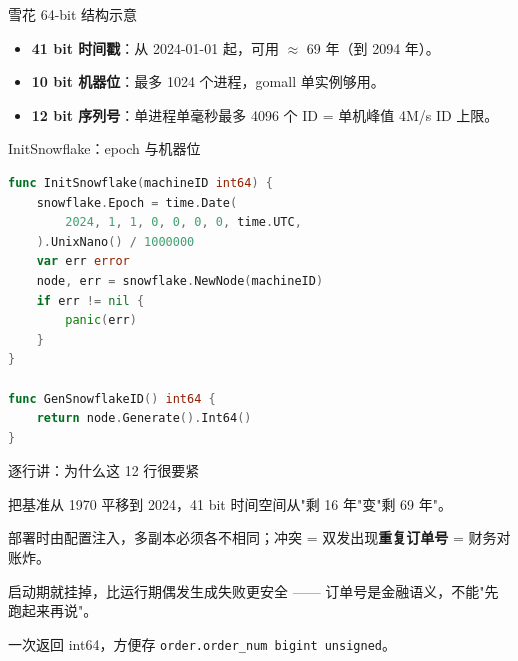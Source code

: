\documentclass[aspectratio=169,11pt]{beamer}
\begin{document}
\begin{frame}[shrink]{雪花 64-bit 结构示意}
\vspace{4mm}
\begin{itemize}
  \item \textbf{41 bit 时间戳}：从 2024-01-01 起，可用 $\approx$ 69 年（到 2094 年）。
  \item \textbf{10 bit 机器位}：最多 1024 个进程，gomall 单实例够用。
  \item \textbf{12 bit 序列号}：单进程单毫秒最多 4096 个 ID = 单机峰值 4M/s ID 上限。
\end{itemize}
\end{frame}

\begin{frame}{InitSnowflake：epoch 与机器位}
\begin{lstlisting}[language=Go,firstnumber=10,
  caption={}]
func InitSnowflake(machineID int64) {
    snowflake.Epoch = time.Date(
        2024, 1, 1, 0, 0, 0, 0, time.UTC,
    ).UnixNano() / 1000000
    var err error
    node, err = snowflake.NewNode(machineID)
    if err != nil {
        panic(err)
    }
}

func GenSnowflakeID() int64 {
    return node.Generate().Int64()
}
\end{lstlisting}
\end{frame}

\begin{frame}[shrink]{逐行讲：为什么这 12 行很要紧}
\begin{description}\setlength{\itemsep}{0.4mm}
  \item[\texttt{Epoch=2024-01-01}] 把基准从 1970 平移到 2024，41 bit 时间空间从"剩 16 年"变"剩 69 年"。
  \item[\texttt{machineID}] 部署时由配置注入，多副本必须各不相同；冲突 = 双发出现\textbf{重复订单号} = 财务对账炸。
  \item[\texttt{NewNode 失败 panic}] 启动期就挂掉，比运行期偶发生成失败更安全 —— 订单号是金融语义，不能"先跑起来再说"。
  \item[\texttt{Generate().Int64()}] 一次返回 int64，方便存 \texttt{order.order\_num bigint unsigned}。
\end{description}
\vspace{2mm}
\end{frame}
\end{document}
